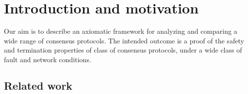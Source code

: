 \documentclass[]{acm_proc_article-sp}
\title{\papertitle}
\author{
L.G. Meredith\\
  \affaddr{Biosimilarity, LLC}\\
  \email{\fontsize{8}{8}\selectfont lgreg.meredith@biosimilarity.com}
\and
Vlad Zamfir\\
  \affaddr{Ethereum}\\
  \email{\fontsize{8}{8}\selectfont vldzmfr@gmail.com}
\and
Vitalik Buterin\\
  \affaddr{Ethereum}\\
  \email{\fontsize{8}{8}\selectfont vitalik.buterin@ethereum.org}
\and
Matthew Wampler-Doty\\
  \affaddr{MIT}\\
  \email{\fontsize{8}{8}\selectfont matthew.wampler.doty@gmail.com}
\and
Aaron Fisher\\
  \affaddr{Colony}\\
  \email{\fontsize{8}{8}\selectfont aron.mathsguy@gmail.com}
}
\numberwithin{equation}{subsection}
\newcommand{\paperversion}{Draft Version 0.1 - 26 August, 2016}
\newenvironment{toc}
{
\begin{list}{}{
   \setlength{\leftmargin}{0.4in}
   \setlength{\rightmargin}{0.6in}
   \setlength{\parskip}{0pt}
 } \item }
{\end{list}}
\begin{document}
\lstset{language=}

\setlength{\topmargin}{0in}
\setlength{\textheight}{8.5in}
\setlength{\parskip}{6pt}


\begin{abstract}
\normalsize{ 

  We present an axiomatic framework for reasoning about consensus protocols.

}

\end{abstract}


\maketitle




\section{Introduction and motivation}

Our aim is to describe an axiomatic framework for analyzing and
comparing a wide range of consensus protocols. The intended outcome is
a proof of the safety and termination properties of class of consensus
protocols, under a wide class of fault and network conditions.

\subsection{Related work}
\end{document}
